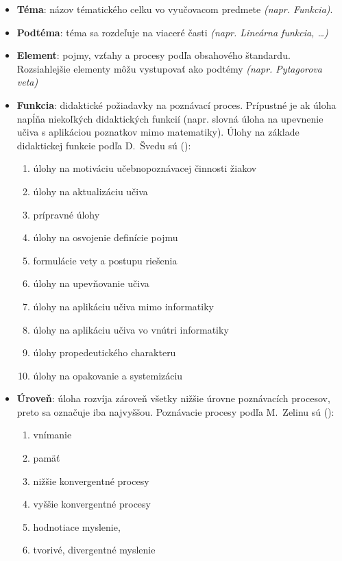 \begin{itemize}
\itemsep0pt
\item \textbf{Téma}: názov tématického celku vo vyučovacom predmete \emph{(napr. Funkcia)}.
\item \textbf{Podtéma}: téma sa rozdeľuje na viaceré časti \emph{(napr. Lineárna funkcia, \dots)}
\item \textbf{Element}: pojmy, vzťahy a procesy podľa obsahového štandardu. Rozsiahlejšie elementy môžu vystupovať ako podtémy \emph{(napr. Pytagorova veta)}
\item \textbf{Funkcia}: didaktické požiadavky na poznávací proces. Prípustné je ak úloha napĺňa niekoľkých didaktických funkcií (napr. slovná úloha na upevnenie učiva s aplikáciou poznatkov mimo matematiky). Úlohy na základe didaktickej funkcie podľa D.~Švedu sú (\cite{sveda_ulohy_1992}):
\begin{enumerate}[label=\alph*),noitemsep,topsep=0pt]
\item úlohy na motiváciu učebnopoznávacej činnosti žiakov
\item úlohy na aktualizáciu učiva
\item prípravné úlohy
\item úlohy na osvojenie definície pojmu
\item formulácie vety a postupu riešenia
\item úlohy na upevňovanie učiva
\item úlohy na aplikáciu učiva mimo informatiky
\item úlohy na aplikáciu učiva vo vnútri informatiky
\item úlohy propedeutického charakteru
\item úlohy na opakovanie a systemizáciu
\end{enumerate}

\item \textbf{Úroveň}: úloha rozvíja zároveň všetky nižšie úrovne poznávacích procesov, preto sa označuje iba najvyššou. Poznávacie procesy podľa M.~Zelinu sú (\cite{zelina_tvorivost_1990}):
\begin{enumerate}[label=\alph*),noitemsep,topsep=0pt]
\item vnímanie
\item pamäť
\item nižšie konvergentné procesy
\item vyššie konvergentné procesy
\item hodnotiace myslenie,
\item tvorivé, divergentné myslenie
\end{enumerate}
\end{itemize}

